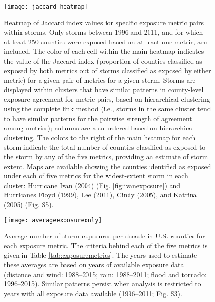 \documentclass[fleqn,10pt,lineno]{olplainarticle}
\begin{document}


\begin{figure}%
\centering 
\texttt{[image: jaccard\_heatmap]} 
\caption{Heatmap of Jaccard index values for
specific exposure metric pairs within storms. Only storms between 1996 and 2011,
and for which at least 250 counties were exposed based on at least one metric,
are included. The color of each cell within the main heatmap indicates the value
of the Jaccard index (proportion of counties classified as exposed by both
metrics out of storms classified as exposed by either metric) for a given pair
of metrics for a given storm. Storms are displayed within clusters that have
similar patterns in county-level exposure agreement for metric pairs, based on
hierarchical clustering using the complete link method
\citep{murtagh2012algorithms} (i.e., storms in the same cluster tend to have
similar patterns for the pairwise strength of agreement among metrics); columns
are also ordered based on hierarchical clustering. The colors to the right of
the main heatmap for each storm indicate the total number of counties classified
as exposed to the storm by any of the five metrics, providing an estimate of
storm extent. Maps are available showing the counties identified as exposed
under each of five metrics for the widest-extent storm in each cluster:
Hurricane Ivan (2004) (Fig. \ref{fig:ivanexposure}) and Hurricanes Floyd (1999),
Lee (2011), Cindy (2005), and Katrina (2005) (Fig. S5).} 
\label{fig:jaccard}
\end{figure}

\begin{figure*}%
\centering
\texttt{[image: averageexposureonly]} 
\caption{Average number of storm exposures per decade in U.S. counties for 
each exposure metric. The criteria behind each of the five metrics is given 
in Table \ref{tab:exposuremetrics}. The years used to estimate these averages 
are based on years of available exposure data (distance and wind: 1988--2015; 
rain: 1988--2011; flood and tornado: 1996--2015). Similar patterns persist when
analysis is restricted to years with all exposure data available (1996--2011;
Fig. S3).} 
\label{fig:averageexposure} 
\end{figure*}








\end{document}
